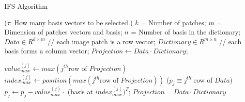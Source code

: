 \documentclass[letterpaper]{article}
\begin{document}
\begin{algorithm}[h]
  \caption{IFS Algorithm}
  \begin{small}
  \begin{algorithmic}[]
    \State ($\tau$: How many basis vectors to be selected.)
  	\State $k$ = Number of patches; 
  	\State $m$ = Dimension of patches vectors and basis;
  	\State $n$ = Number of basis in the dictionary;
    \State $Data \in R^{k \times m}$ // each image patch is a row vector;
    \State $Dictionary \in R^{m \times n}$ // each basis forms a column vector;
    \State $Projection \leftarrow Data\cdot Dictionary;$

    	\State $value_{max}^{(j)} \leftarrow max(j^{th} \mbox{row of }Projection)$
    	\State $index_{max}^{(j)} \leftarrow position(max(j^{th} \mbox{row of }Projection))$
    \State ($p_j\equiv j^{th}$ row of $Data$)
	 \State$p_j\leftarrow p_j-value_{max}^{(j)}\cdot$ (basis at $index_{max}^{(j)})^T$;
         \EndFor
         \State $Projection = Data\cdot Dictionary$
    \EndFor 

  \end{algorithmic}
  \end{small}
\end{algorithm}

\end{document}
